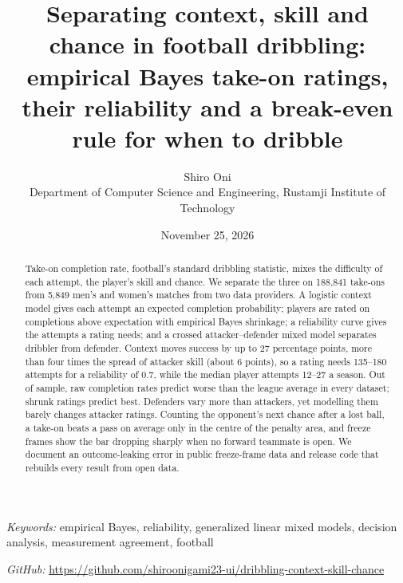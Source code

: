 \documentclass[
  12pt]{article}
\begin{document}
\def\spacingset#1{\renewcommand{\baselinestretch}%
{#1}\small\normalsize} \spacingset{1}



\date{November 25, 2026}
\title{\bf Separating context, skill and chance in football dribbling:
empirical Bayes take-on ratings, their reliability and a break-even rule
for when to dribble}
\author{
Shiro Oni\\
Department of Computer Science and Engineering, Rustamji Institute of
Technology\\
}
\maketitle

\bigskip
\bigskip
\begin{abstract}
Take-on completion rate, football's standard dribbling statistic, mixes
the difficulty of each attempt, the player's skill and chance. We
separate the three on 188,841 take-ons from 5,849 men's and women's
matches from two data providers. A logistic context model gives each
attempt an expected completion probability; players are rated on
completions above expectation with empirical Bayes shrinkage; a
reliability curve gives the attempts a rating needs; and a crossed
attacker--defender mixed model separates dribbler from defender. Context
moves success by up to 27 percentage points, more than four times the
spread of attacker skill (about 6 points), so a rating needs 135--180
attempts for a reliability of 0.7, while the median player attempts
12--27 a season. Out of sample, raw completion rates predict worse than
the league average in every dataset; shrunk ratings predict best.
Defenders vary more than attackers, yet modelling them barely changes
attacker ratings. Counting the opponent's next chance after a lost ball,
a take-on beats a pass on average only in the centre of the penalty
area, and freeze frames show the bar dropping sharply when no forward
teammate is open. We document an outcome-leaking error in public
freeze-frame data and release code that rebuilds every result from open
data.
\end{abstract}

\noindent%
{\it Keywords:} empirical Bayes, reliability, generalized linear mixed
models, decision analysis, measurement agreement, football

\noindent%
{\it GitHub:} \url{https://github.com/shiroonigami23-ui/dribbling-context-skill-chance}
\vfill
\end{document}
